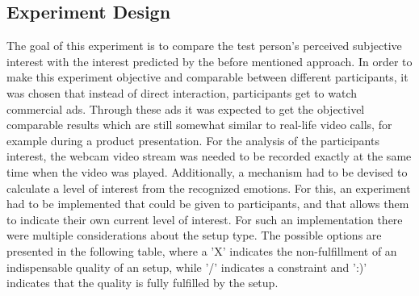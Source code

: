 \subsection{Experiment Design}
The goal of this experiment is to compare the test person's perceived subjective interest with the interest predicted by the before mentioned approach. In order to make this experiment objective and comparable between different participants, it was chosen that instead of direct interaction, participants get to watch commercial ads. Through these ads it was expected to get the objectivel comparable results which are still somewhat similar to real-life video calls, for example during a product presentation.
\newline\newline
For the analysis of the participants interest, the webcam video stream was needed to be recorded exactly at the same time when the video was played. Additionally, a mechanism had to be devised to calculate a level of interest from the recognized emotions. For this, an experiment had to be implemented that could be given to participants, and that allows them to indicate their own current level of interest.
\newline\newline
For such an implementation there were multiple considerations about the setup type. The possible options are presented in the following table, where a 'X' indicates the non-fulfillment of an indispensable quality of an setup, while '/' indicates a constraint and ':)' indicates that the quality is fully fulfilled by the setup.

